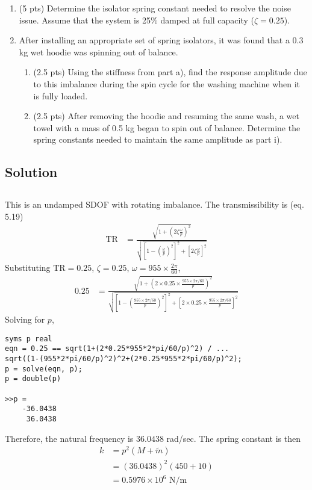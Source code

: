 \begin{enumerate}[label=(\alph*)]
    \item (5 pts) Determine the isolator spring constant needed to resolve the noise issue. Assume that the system is 25\% damped at full capacity ($\zeta = 0.25$).
    \item After installing an appropriate set of spring isolators, it was found that a 0.3 kg wet hoodie was spinning out of balance.
    \begin{enumerate}[label=(\roman*)]
        \item (2.5 pts) Using the stiffness from part a), find the response amplitude due to this imbalance during the spin cycle for the washing machine when it is fully loaded.
        \item (2.5 pts) After removing the hoodie and resuming the same wash, a wet towel with a mass of 0.5 kg began to spin out of balance. Determine the spring constants needed to maintain the same amplitude as part i).
    \end{enumerate}
\end{enumerate}

\subsection*{Solution}
\subsection{}
This is an undamped SDOF with rotating imbalance. The transmissibility is (eq. 5.19)
\begin{align*}
    \text{TR} &= \frac{\sqrt{1 + \left(2 \zeta \frac{\omega}{p}\right)^2}}{\sqrt{\left[1 - \left(\frac{\omega}{p}\right)^2\right]^2 + \left[2 \zeta \frac{\omega}{p}\right]^2}}
\end{align*}
Substituting $\text{TR} = 0.25$, $\zeta = 0.25$, $\omega = 955 \times \frac{2\pi}{60}$, 
\begin{align*}
    0.25 &= \frac{\sqrt{1 + \left(2 \times 0.25 \times \frac{955 \times 2\pi/60}{p}\right)^2}}{\sqrt{\left[1 - \left(\frac{955 \times 2\pi/60}{p}\right)^2\right]^2 + \left[2 \times 0.25 \times \frac{955 \times 2\pi/60}{p}\right]^2}} 
\end{align*}
Solving for $p$,
\begin{verbatim}
syms p real
eqn = 0.25 == sqrt(1+(2*0.25*955*2*pi/60/p)^2) / ...
sqrt((1-(955*2*pi/60/p)^2)^2+(2*0.25*955*2*pi/60/p)^2);
p = solve(eqn, p);
p = double(p)

>>p =
    -36.0438
     36.0438
\end{verbatim}
Therefore, the natural frequency is $36.0438$ rad/sec. The spring constant is then
\begin{align*}
    k &= p^2(M+ \tilde{m}) \\
    &= (36.0438)^2(450 + 10) \\
    &= \boxed{0.5976 \times 10^6 \text{ N/m}} 
\end{align*}

